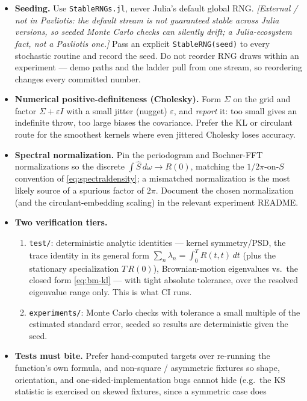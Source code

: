 \documentclass[11pt]{article}
\newcommand{\extnote}[1]{{\small\color{extgray}\emph{[External / not in Pavliotis: #1]}}}
\begin{document}
\begin{itemize}[leftmargin=1.4cm]
  \item \textbf{Seeding.} Use \texttt{StableRNGs.jl}, never Julia's default global RNG. \extnote{the
  default stream is not guaranteed stable across Julia versions, so seeded Monte Carlo checks can
  silently drift; a Julia-ecosystem fact, not a Pavliotis one.} Pass an explicit
  \texttt{StableRNG(seed)} to every stochastic routine and record the seed. Do not reorder RNG draws
  within an experiment --- demo paths and the ladder pull from one stream, so reordering changes every
  committed number.
  \item \textbf{Numerical positive-definiteness (Cholesky).} Form $\Sigma$ on the grid and factor
  $\Sigma+\varepsilon I$ with a small jitter (nugget) $\varepsilon$, and \emph{report} it: too small
  gives an indefinite throw, too large biases the covariance. Prefer the KL or circulant route for the
  smoothest kernels where even jittered Cholesky loses accuracy.
  \item \textbf{Spectral normalization.} Pin the periodogram and Bochner-FFT normalizations so the
  discrete $\int\hat S\,d\omega\to R(0)$, matching the $1/2\pi$-on-$S$ convention of
  \eqref{eq:spectraldensity}; a mismatched normalization is the most likely source of a spurious
  factor of $2\pi$. Document the chosen normalization (and the circulant-embedding scaling) in the
  relevant experiment README.
  \item \textbf{Two verification tiers.}
  \begin{enumerate}
    \item \texttt{test/}: deterministic analytic identities --- kernel symmetry/PSD, the trace
    identity in its general form $\sum_n\lambda_n=\int_0^T R(t,t)\,dt$ (plus the stationary
    specialization $T\,R(0)$), Brownian-motion eigenvalues vs.\ the closed form \eqref{eq:bm-kl} ---
    with tight absolute tolerance, over the resolved eigenvalue range only. This is what CI runs.
    \item \texttt{experiments/}: Monte Carlo checks with tolerance a small multiple of the estimated
    standard error, seeded so results are deterministic given the seed.
  \end{enumerate}
  \item \textbf{Tests must bite.} Prefer hand-computed targets over re-running the function's own
  formula, and non-square / asymmetric fixtures so shape, orientation, and one-sided-implementation
  bugs cannot hide (e.g.\ the KS statistic is exercised on skewed fixtures, since a symmetric case does

\end{itemize}
\end{document}
